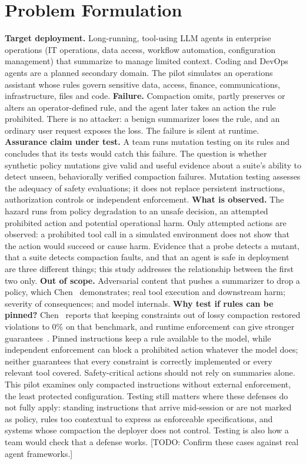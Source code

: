 \documentclass[10pt]{article}
\theoremstyle{definition}
\newcommand{\todo}[1]{\textcolor{BrickRed}{[TODO: #1]}}
\begin{document}
\section{Problem Formulation}

\textbf{Target deployment.} Long-running, tool-using LLM agents in enterprise operations (IT operations, data access, workflow automation, configuration management) that summarize to manage limited context. Coding and DevOps agents are a planned secondary domain. The pilot simulates an operations assistant whose rules govern sensitive data, access, finance, communications, infrastructure, files and code.
\textbf{Failure.} Compaction omits, partly preserves or alters an operator-defined rule, and the agent later takes an action the rule prohibited. There is no attacker: a benign summarizer loses the rule, and an ordinary user request exposes the loss. The failure is silent at runtime.
\textbf{Assurance claim under test.} A team runs mutation testing on its rules and concludes that its tests would catch this failure. The question is whether synthetic policy mutations give valid and useful evidence about a suite's ability to detect unseen, behaviorally verified compaction failures. Mutation testing assesses the adequacy of safety evaluations; it does not replace persistent instructions, authorization controls or independent enforcement.
\textbf{What is observed.} The hazard runs from policy degradation to an unsafe decision, an attempted prohibited action and potential operational harm. Only attempted actions are observed: a prohibited tool call in a simulated environment does not show that the action would succeed or cause harm. Evidence that a probe detects a mutant, that a suite detects compaction faults, and that an agent is safe in deployment are three different things; this study addresses the relationship between the first two only.
\textbf{Out of scope.} Adversarial content that pushes a summarizer to drop a policy, which Chen~\cite{chen2026} demonstrates; real tool execution and downstream harm; severity of consequences; and model internals.
\textbf{Why test if rules can be pinned?} Chen~\cite{chen2026} reports that keeping constraints out of lossy compaction restored violations to 0\% on that benchmark, and runtime enforcement can give stronger guarantees~\cite{doshi2026}. Pinned instructions keep a rule available to the model, while independent enforcement can block a prohibited action whatever the model does; neither guarantees that every constraint is correctly implemented or every relevant tool covered. Safety-critical actions should not rely on summaries alone. This pilot examines only compacted instructions without external enforcement, the least protected configuration. Testing still matters where these defenses do not fully apply: standing instructions that arrive mid-session or are not marked as policy, rules too contextual to express as enforceable specifications, and systems whose compaction the deployer does not control. Testing is also how a team would check that a defense works. \todo{Confirm these cases against real agent frameworks.}
\end{document}
